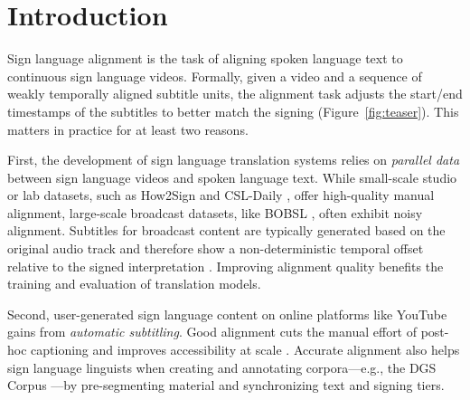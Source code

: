 \documentclass[11pt]{article}
\newcommand{\jyj}[1]{{\textcolor{purple}{[\textbf{jyj: #1}]}}} %
\newcommand{\az}[1]{{\color{blue}[az: #1]}} %
\begin{document}
\section{Introduction}

Sign language alignment is the task of aligning spoken language text to continuous sign language videos. 
Formally, given a video and a sequence of weakly temporally aligned subtitle units, the alignment task adjusts the start/end timestamps of the subtitles to better match the signing (Figure~\ref{fig:teaser}). This matters in practice for at least two reasons.

First, the development of sign language translation systems \citep{muller-etal-2022-findings,muller-etal-2023-findings,de2023machine,ham2021ksl} relies on \textit{parallel data} between sign language videos and spoken language text. While small-scale studio or lab datasets, such as How2Sign \citep{Duarte_CVPR2021} and CSL-Daily \citep{zhou2021improving}, offer high-quality manual alignment, large-scale broadcast datasets, like BOBSL \citep{dataset:albanie2021bobsl}, often exhibit noisy alignment. Subtitles for broadcast content are typically generated based on the original audio track and therefore show a non-deterministic temporal offset relative to the signed interpretation \citep{muller-etal-2022-findings}. Improving alignment quality benefits the training and evaluation of translation models.


Second, user-generated sign language content on online platforms like YouTube \citep{uthus_youtube-asl_2023,tanzer2025youtubesl25} gains from \emph{automatic subtitling}.
Good alignment cuts the manual effort of post-hoc captioning and improves accessibility at scale \citep{gernsbacher2015video}. 
Accurate alignment also helps sign language linguists when creating and annotating corpora—e.g., the DGS Corpus \citep{dataset:hanke-etal-2020-extending}—by pre-segmenting material and synchronizing text and signing tiers.
\end{document}
